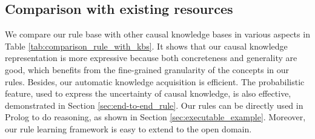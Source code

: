 \subsection{Comparison with existing resources}
We compare our rule base with other causal knowledge bases in various aspects in Table \ref{tab:comparison_rule_with_kbs}. 
It shows that our causal knowledge representation is more expressive because both concreteness and generality are good, which benefits from the fine-grained granularity of the concepts in our rules. 
Besides, our automatic knowledge acquisition is efficient.
The probabilistic feature, used to express the uncertainty of causal knowledge, is also effective, demonstrated in Section \ref{sec:end-to-end_rule}. 
Our rules can be directly used in Prolog to do reasoning, as shown in Section \ref{sec:executable_example}.
Moreover, our rule learning framework is easy to extend to the open domain.
